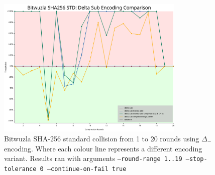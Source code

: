 \documentclass[a4paper]{report}
\begin{document}
\begin{figure}[H]
	\centering
	\includegraphics[width=0.8\textwidth]{../../graphs/bitwuzla_delta_sub_encoding_comparison.svg}
	\caption{Bitwuzla SHA-256 standard collision from 1 to 20 rounds using $\Delta_-$ encoding. Where each colour line represents a different encoding variant.
	Results ran with arguments \texttt{--round-range 1..19 --stop-tolerance 0 --continue-on-fail true}}
	\label{fig:delta_sub}
\end{figure}
\end{document}
